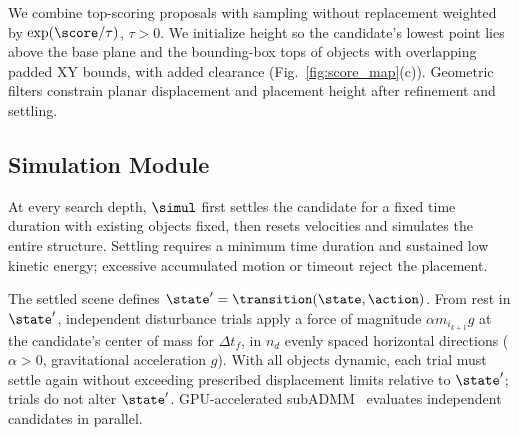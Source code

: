 We combine top-scoring proposals with sampling without replacement weighted by $\exp(\score/\tau)$, $\tau>0$.
We initialize height so the candidate's lowest point lies above the base plane and the bounding-box tops of objects with overlapping padded XY bounds, with added clearance (Fig.~\ref{fig:score_map}(c)).
Geometric filters constrain planar displacement and placement height after refinement and settling.

\subsection{Simulation Module}\label{sec:simulation}
At every search depth, $\simul$ first settles the candidate for a fixed time duration with existing objects fixed, then resets velocities and simulates the entire structure.
Settling requires a minimum time duration and sustained low kinetic energy; excessive accumulated motion or timeout reject the placement.

The settled scene defines $\state'=\transition(\state,\action)$.
From rest in $\state'$, independent disturbance trials apply a force of magnitude $\alpha m_{i_{k+1}}g$ at the candidate's center of mass for $\Delta t_f$, in $n_d$ evenly spaced horizontal directions ($\alpha>0$, gravitational acceleration $g$).
With all objects dynamic, each trial must settle again without exceeding prescribed displacement limits relative to $\state'$; trials do not alter $\state'$.
GPU-accelerated subADMM~\cite{ji2025gpu} evaluates independent candidates in parallel.



